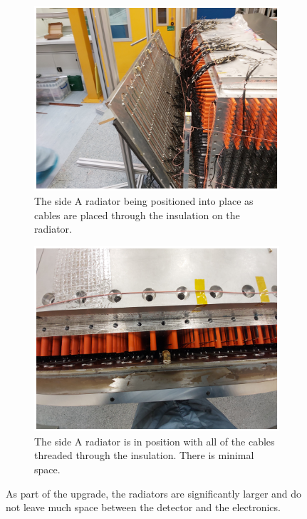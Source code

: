 \begin{figure}[htbp]
\centering
\begin{subfigure}{.5\textwidth}
  \centering
  \includegraphics[width=\linewidth]{Chapter3/Figs/Raster/detCon026b_HaningOffRadiator.png}
  \captionsetup{width=.9\linewidth}
  \caption{The side A radiator being positioned into place as cables are placed through the insulation on the radiator.}
  \label{subFig:detCon026b_HaningOffRadiator}
\end{subfigure}%
\begin{subfigure}{.5\textwidth}
  \centering
  \includegraphics[width=\linewidth]{Chapter3/Figs/Raster/detCon028b_RadiatorTopDown.png}
  \captionsetup{width=.9\linewidth}
  \caption{The side A radiator is in position with all of the cables threaded through the insulation. There is minimal space.}
  \label{subFig:detCon028b_RadiatorTopDown}
\end{subfigure}
\caption{As part of the upgrade, the radiators are significantly larger and do not leave much space between the detector and the electronics.}
\label{fig:detCon_HaningOffRadiator_RadiatorTopDown}
\end{figure}

